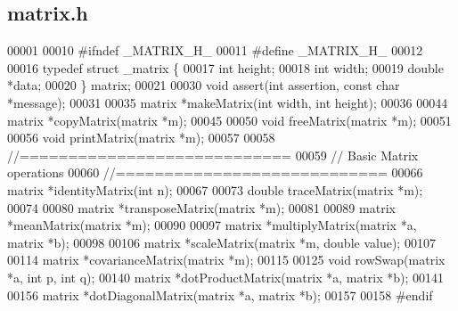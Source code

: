 \subsection{matrix.\+h}
\label{a00041_source}

\begin{DoxyCode}
00001 
00010 \textcolor{preprocessor}{#ifndef \_MATRIX\_H\_}
00011 \textcolor{preprocessor}{#define \_MATRIX\_H\_}
00012 
00016 \textcolor{keyword}{typedef} \textcolor{keyword}{struct }_matrix \{
00017   \textcolor{keywordtype}{int} height;
00018   \textcolor{keywordtype}{int} width;
00019   \textcolor{keywordtype}{double} *data;
00020 \} matrix;
00021 
00030 \textcolor{keywordtype}{void} assert(\textcolor{keywordtype}{int} assertion, \textcolor{keyword}{const} \textcolor{keywordtype}{char} *message);
00031 
00035 matrix *makeMatrix(\textcolor{keywordtype}{int} width, \textcolor{keywordtype}{int} height);
00036 
00044 matrix *copyMatrix(matrix *m);
00045 
00050 \textcolor{keywordtype}{void} freeMatrix(matrix *m);
00051 
00056 \textcolor{keywordtype}{void} printMatrix(matrix *m);
00057 
00058 \textcolor{comment}{//============================}
00059 \textcolor{comment}{// Basic Matrix operations}
00060 \textcolor{comment}{//============================}
00066 \textcolor{comment}{}matrix *identityMatrix(\textcolor{keywordtype}{int} n);
00067 
00073 \textcolor{keywordtype}{double} traceMatrix(matrix *m);
00074 
00080 matrix *transposeMatrix(matrix *m);
00081 
00089 matrix *meanMatrix(matrix *m);
00090 
00097 matrix *multiplyMatrix(matrix *a, matrix *b);
00098 
00106 matrix *scaleMatrix(matrix *m, \textcolor{keywordtype}{double} value);
00107 
00114 matrix *covarianceMatrix(matrix *m);
00115 
00125 \textcolor{keywordtype}{void} rowSwap(matrix *a, \textcolor{keywordtype}{int} p, \textcolor{keywordtype}{int} q);
00140 matrix *dotProductMatrix(matrix *a, matrix *b);
00141 
00156 matrix *dotDiagonalMatrix(matrix *a, matrix *b);
00157 
00158 \textcolor{preprocessor}{#endif}
\end{DoxyCode}
